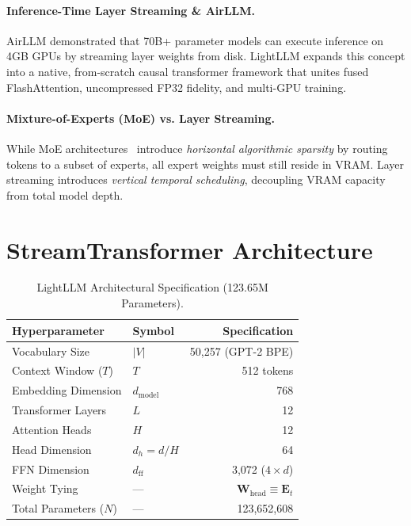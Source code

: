 \documentclass[10pt,twocolumn,a4paper]{article}
\begin{document}
\paragraph{Inference-Time Layer Streaming & AirLLM.}
AirLLM demonstrated that 70B+ parameter models can execute inference on 4GB GPUs by streaming layer weights from disk. LightLLM expands this concept into a native, from-scratch causal transformer framework that unites fused FlashAttention, uncompressed FP32 fidelity, and multi-GPU training.

\paragraph{Mixture-of-Experts (MoE) vs. Layer Streaming.}
While MoE architectures~\citep{shazeer2017outrageously,fedus2022switch} introduce \emph{horizontal algorithmic sparsity} by routing tokens to a subset of experts, all expert weights must still reside in VRAM. Layer streaming introduces \emph{vertical temporal scheduling}, decoupling VRAM capacity from total model depth.

\section{StreamTransformer Architecture}
\label{sec:arch}

\begin{table}[t]
\centering
\small
\caption{LightLLM Architectural Specification (123.65M Parameters).}
\label{tab:arch_spec}
\begin{tabular}{llr}
\toprule
\textbf{Hyperparameter} & \textbf{Symbol} & \textbf{Specification} \\
\midrule
Vocabulary Size & $|V|$ & 50,257 (GPT-2 BPE) \\
Context Window ($T$) & $T$ & 512 tokens \\
Embedding Dimension & $d_{\text{model}}$ & 768 \\
Transformer Layers & $L$ & 12 \\
Attention Heads & $H$ & 12 \\
Head Dimension & $d_h = d/H$ & 64 \\
FFN Dimension & $d_{\text{ff}}$ & 3,072 ($4 \times d$) \\
Weight Tying & — & $\mathbf{W}_{\text{head}} \equiv \mathbf{E}_t$ \\
Total Parameters ($N$) & — & 123,652,608 \\
\bottomrule
\end{tabular}
\end{table}
\end{document}
